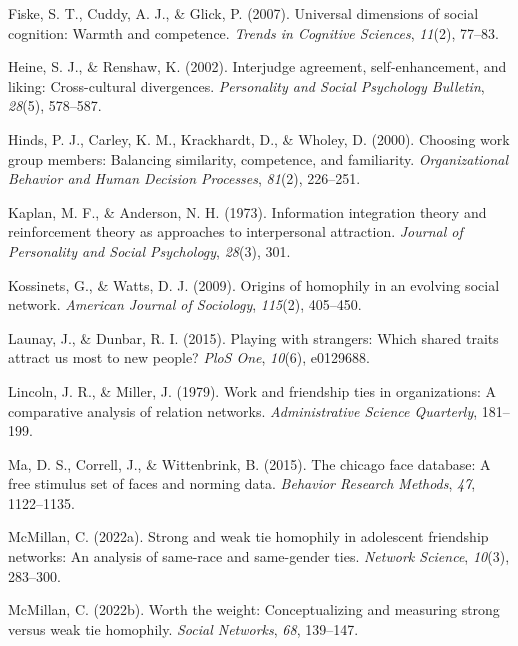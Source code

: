 \documentclass[
  man,
  floatsintext,
  longtable,
  nolmodern,
  notxfonts,
  notimes,
  draftfirst,
  colorlinks=true,linkcolor=blue,citecolor=blue,urlcolor=blue]{apa7}
\newlength{\cslhangindent}
\newenvironment{CSLReferences}[2] %
 {\begin{list}{}{%
  \setlength{\itemindent}{0pt}
  \setlength{\leftmargin}{0pt}
  \setlength{\parsep}{0pt}
  \ifodd #1
   \setlength{\leftmargin}{\cslhangindent}
   \setlength{\itemindent}{-1\cslhangindent}
  \fi
  \setlength{\itemsep}{#2\baselineskip}}}
 {\end{list}}
\begin{document}
\begin{CSLReferences}{1}{0}
Fiske, S. T., Cuddy, A. J., \& Glick, P. (2007). Universal dimensions of
social cognition: Warmth and competence. \emph{Trends in Cognitive
Sciences}, \emph{11}(2), 77--83.

Heine, S. J., \& Renshaw, K. (2002). Interjudge agreement,
self-enhancement, and liking: Cross-cultural divergences.
\emph{Personality and Social Psychology Bulletin}, \emph{28}(5),
578--587.

Hinds, P. J., Carley, K. M., Krackhardt, D., \& Wholey, D. (2000).
Choosing work group members: Balancing similarity, competence, and
familiarity. \emph{Organizational Behavior and Human Decision
Processes}, \emph{81}(2), 226--251.

Kaplan, M. F., \& Anderson, N. H. (1973). Information integration theory
and reinforcement theory as approaches to interpersonal attraction.
\emph{Journal of Personality and Social Psychology}, \emph{28}(3), 301.

Kossinets, G., \& Watts, D. J. (2009). Origins of homophily in an
evolving social network. \emph{American Journal of Sociology},
\emph{115}(2), 405--450.

Launay, J., \& Dunbar, R. I. (2015). Playing with strangers: Which
shared traits attract us most to new people? \emph{PloS One},
\emph{10}(6), e0129688.

Lincoln, J. R., \& Miller, J. (1979). Work and friendship ties in
organizations: A comparative analysis of relation networks.
\emph{Administrative Science Quarterly}, 181--199.

Ma, D. S., Correll, J., \& Wittenbrink, B. (2015). The chicago face
database: A free stimulus set of faces and norming data. \emph{Behavior
Research Methods}, \emph{47}, 1122--1135.

McMillan, C. (2022a). Strong and weak tie homophily in adolescent
friendship networks: An analysis of same-race and same-gender ties.
\emph{Network Science}, \emph{10}(3), 283--300.

McMillan, C. (2022b). Worth the weight: Conceptualizing and measuring
strong versus weak tie homophily. \emph{Social Networks}, \emph{68},
139--147.


\end{CSLReferences}
\end{document}
